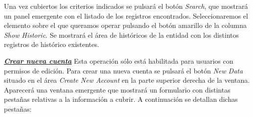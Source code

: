 Una vez cubiertos los criterios indicados se pulsará el botón \emph{Search}, que mostrará un panel emergente con el listado de los registros encontrados. Seleccionaremos el elemento sobre el que queramos operar pulsando el botón amarillo de la columna \emph{Show Historic}. Se mostrará el área de históricos de la entidad con los distintos registros de histórico existentes.


\underline{\textsl{\textbf{Crear nueva cuenta}}}\newline
Esta operación sólo está habilitada para usuarios con permisos de edición.
Para crear una nueva cuenta se pulsará el botón \textit{New Data} situado en el área \emph{Create New Account} en la parte superior derecha de la ventana. Aparecerá una ventana emergente que mostrará un formulario con distintas pestañas relativas a la información a cubrir. A continuación se detallan dichas pestañas:
